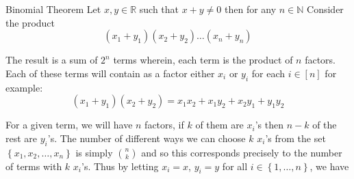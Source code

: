 \begin{proposition}{Binomial Theorem}
Let $x, y \in \mathbb{R}$ such that $x  +  y \neq 0$ then for any $n \in \mathbb{N}$                                                                      
Consider the product                                                                                                                                      
\[
\left( x_{1}  +  y_{1} \right) \left( x_{2}  +  y_{2} \right) \ldots \left( x_{n}  +  y_{n} \right)
\]
                                                                                                                                                          
The result is a sum of \(2^{n}\) terms wherein, each term is the product of \(n\) factors. Each of these terms will contain as a factor                   
either \(x_{i}\) or \(y_{i}\) for each \(i \in \left[ n \right]\) for                                                                                     example:                                                                                                                                                  
\[                                                                                                                                                        
\left( x_{1}  +  y_{1} \right)\left( x_{2} +  y_{2} \right) = x_{1}x_{2}  +  x_{1}y_{2}  +  x_{2}y_{1}  +  y_{1}y_{2}                                     
\]                                                                                                                                                        
                                                                                                                                                          
For a given term, we will have \(n\) factors, if \(k\) of them are \(x_{i}\)'s then \(n-k\) of the rest are \(y_{i}\)'s. The number of different ways we can choose \(k\) \(x_{i}\)'s from the set \(\left\{ x_{1}, x_{2}, \ldots, x_{n} \right\}\) is simply \(\binom{n}{k}\) and so this corresponds precisely to     the number of terms with \(k\) \(x_{i}\)'s. Thus by letting \(x_{i} = x\), \(y_{i} = y\) for all \(i \in \left\{ 1, \ldots, n \right\}\), we have
\end{proposition}





